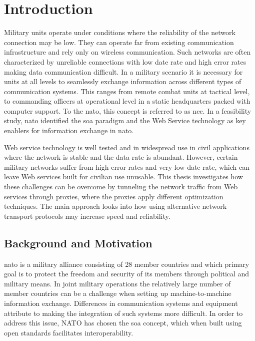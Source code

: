 
\chapter{Introduction}

Military units operate under conditions where the reliability of the network
connection may be low. They can operate far from existing communication
infrastructure and rely only on wireless communication. Such networks are often
characterized by unreliable connections with low date rate and high error rates
making data communication difficult. In a military scenario it is necessary for
units at all levels to seamlessly exchange information across different types of
communication systems. This ranges from remote combat units at tactical level,
to commanding officers at operational level in a static headquarters packed with
computer support. To the \gls{nato}, this concept is referred to as \gls{nec}.
In a feasibility study, \gls{nato} identified the \gls{soa} paradigm and the Web
Service technology as key enablers for information exchange in
\gls{nato}\cite{nnec-study}.

Web service technology is well tested and in widespread use in civil
applications where the network is stable and the data rate is abundant. However,
certain military networks suffer from high error rates and very low date rate,
which can leave Web services built for civilian use unusable. This thesis
investigates how these challenges can be overcome by tunneling the network
traffic from Web services through proxies, where the proxies apply different
optimization techniques. The main approach looks into how using alternative
network transport protocols may increase speed and reliability.

\section{Background and Motivation}

\gls{nato} is a military alliance consisting of 28 member countries
\cite{nato-homepage-member-countries} and which primary goal is to protect the
freedom and security of its members through political and military means. In
joint military operations the relatively large number of member countries can be
a challenge when setting up machine-to-machine information exchange. Differences
in communication systems and equipment attribute to making the integration of
such systems more difficult. In order to address this issue, NATO has chosen the
\gls{soa} concept, which when built using open standards facilitates
interoperability\cite{nnec-study}.

